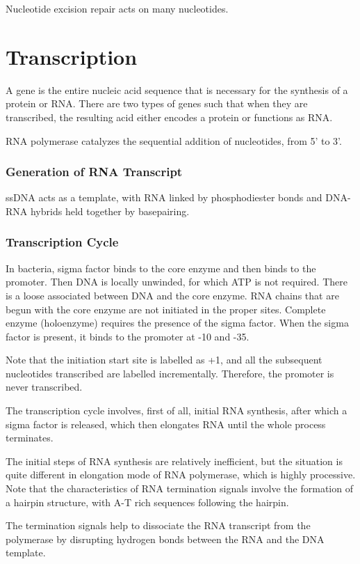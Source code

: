 \documentclass[11pt]{scrartcl}
\begin{document}
  Nucleotide excision repair acts on many nucleotides.
  
  \section{Transcription}

  \begin{definition}
A gene is the entire nucleic acid sequence that is necessary for the synthesis of a protein or RNA. There are two types of genes such that when they are transcribed, the resulting acid either encodes a protein or functions as RNA.
  \end{definition}
  RNA polymerase  catalyzes the sequential addition of nucleotides, from 5' to 3'.

  \subsubsection{Generation of RNA Transcript}

  ssDNA acts as a template, with RNA linked by phosphodiester bonds
  and DNA-RNA hybrids held together by basepairing.

  \subsubsection{Transcription Cycle}

  In bacteria, sigma factor binds to the core enzyme and then binds to the promoter. Then DNA is locally unwinded, for which ATP is not required. There is a loose associated between DNA and the core enzyme. RNA chains that are begun with the core enzyme are not initiated in the proper sites. Complete enzyme (holoenzyme) requires the presence of the sigma factor. When the sigma factor is present, it binds to the promoter at -10 and -35.

  Note that the initiation start site is labelled as +1, and all the subsequent nucleotides transcribed are labelled incrementally. Therefore, the promoter is never transcribed.

  The transcription cycle involves, first of all, initial RNA synthesis, after which a sigma factor is released, which then elongates RNA until the whole process terminates.

  The initial steps of RNA synthesis are relatively inefficient, but the situation is quite different  in elongation mode of RNA polymerase, which is highly processive. Note that the characteristics of RNA termination signals involve the formation of a hairpin structure, with A-T rich sequences following the hairpin.

  The termination signals help to dissociate the RNA transcript from
  the polymerase by disrupting hydrogen bonds between the RNA and the
  DNA template.
\end{document}
